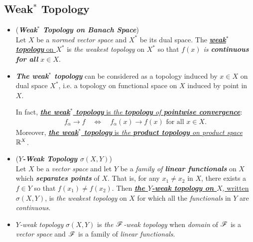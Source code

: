 \documentclass[11pt]{article}
\begin{document}
\subsection{Weak$^{*}$  Topology}
\begin{itemize}
\item \begin{definition}  (\textbf{\emph{Weak$^{*}$ Topology on Banach Space}})\\
Let $X$ be a \emph{normed vector space} and $X^{*}$ be its dual space. The \underline{\emph{\textbf{weak$^{*}$ topology}} on $X^{*}$} is \emph{the weakest topology} on $X^{*}$ so that \emph{$f(x)$ is \textbf{continuous} \textbf{for all} $x \in X$}.
\end{definition}

\item \begin{remark}
\emph{\textbf{The weak$^{*}$ topology}} can be considered as a topology induced by $x \in X$ on dual space $X^{*}$, i.e. a topology on functional space on $X$ induced by point in $X$. 

In fact, \underline{\emph{\textbf{the weak$^{*}$ topology}} is \emph{the \textbf{topology} of \textbf{pointwise convergence}}}:
\begin{align*}
f_{\alpha} \rightarrow  f \quad \Leftrightarrow \quad f_{\alpha}(x) \rightarrow  f(x) \text{ for all }x \in X.
\end{align*} Moreover, \underline{\emph{\textbf{the weak$^{*}$ topology}} is \emph{the \textbf{product topology} on product space ${\mathbb R}^X$}}.
\end{remark}

\item \begin{definition} (\emph{\textbf{$Y$-Weak Topology  $\sigma(X, Y)$}})\\
Let $X$ be a \emph{vector space} and let $Y$ be a \emph{family of \textbf{linear functionals}} on $X$ which \emph{\textbf{separates points}} of $X$. That is, for any $x_1 \neq x_2$ in $X$, there exists a $f \in Y$ so that $f(x_1) \neq f(x_2)$. Then \underline{\emph{\textbf{the $Y$-weak topology on $X$}}, written $\sigma(X, Y)$}, is \emph{the weakest topology} on $X$ for which all the \emph{functionals} in $Y$ are \emph{continuous}. 
\end{definition}

\item \begin{remark}
\emph{$Y$-weak topology} $\sigma(X, Y)$ is \emph{the ${\mathscr F}$-weak topology} when \emph{domain} of  ${\mathscr F}$ is a \emph{vector space} and ${\mathscr F}$ is a family of \emph{linear functionals}.
\end{remark}


\end{itemize}
\end{document}
